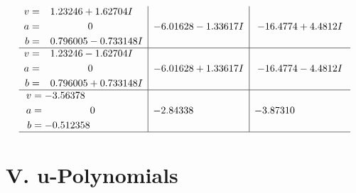 \documentclass[1p]{elsarticle_modified}
\theoremstyle{definition}
\begin{document}
$$\begin{array}{c|c|c}
\begin{aligned}
v &= \phantom{-}1.23246 + 1.62704 I \\
a &= \phantom{-0.000000 } 0 \\
b &= \phantom{-}0.796005 - 0.733148 I\end{aligned}
 & -6.01628 - 1.33617 I & -16.4774 + 4.4812 I \\ \hline\begin{aligned}
v &= \phantom{-}1.23246 - 1.62704 I \\
a &= \phantom{-0.000000 } 0 \\
b &= \phantom{-}0.796005 + 0.733148 I\end{aligned}
 & -6.01628 + 1.33617 I & -16.4774 - 4.4812 I \\ \hline\begin{aligned}
v &= -3.56378\phantom{ +0.000000I} \\
a &= \phantom{-0.000000 } 0 \\
b &= -0.512358\phantom{ +0.000000I}\end{aligned}
 & -2.84338\phantom{ +0.000000I} & -3.87310\phantom{ +0.000000I}\\
 \hline 
 \end{array}$$\newpage
\newpage\renewcommand{\arraystretch}{1}
\centering \section*{ V. u-Polynomials}
\end{document}
